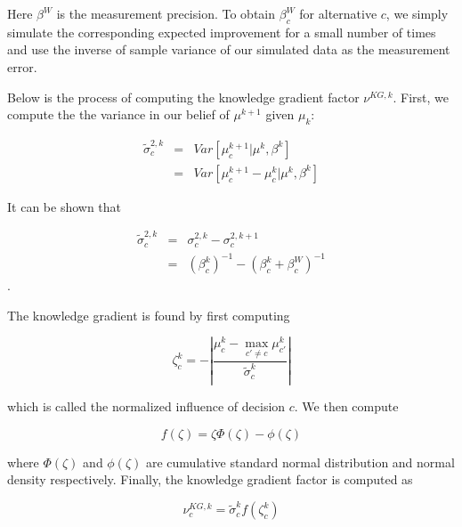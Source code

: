 \documentclass[12pt]{article}
\begin{document}
Here $\beta^W$ is the measurement precision. To obtain $\beta^W_c$ for alternative $c$, we simply simulate the corresponding expected improvement for a small number of times and use the inverse of sample variance of our simulated data as the measurement error. 

Below is the process of computing the knowledge gradient factor $\nu^{KG,k}$. First, we compute the the variance in our belief of $\mu^{k+1}$ given $\mu_k$:

\begin{eqnarray*}
\tilde{\sigma}_c^{2,k} & = & Var[\mu^{k+1}_c|\mu^k,\beta^k] \\
                       & = & Var[\mu^{k+1}_c - \mu_c^k|\mu^k,\beta^k]
\end{eqnarray*}

It can be shown that

\begin{eqnarray*}
\tilde{\sigma}_c^{2,k} & = & \sigma^{2,k}_c-\sigma^{2,k+1}_c \\
                       & = & (\beta_c^k)^{-1}-(\beta_c^k+\beta_c^W)^{-1}
\end{eqnarray*}.

The knowledge gradient is found by first computing

\begin{equation*}
\zeta^k_c = -\left|\frac{\mu_c^k-\max_{c'\ne c} \mu_{c'}^k}{\tilde{\sigma}_c^k}\right|
\end{equation*}

which is called the normalized influence of decision $c$. We then compute 

\begin{equation*}
f(\zeta) = \zeta\Phi(\zeta)-\phi(\zeta)
\end{equation*}

where $\Phi(\zeta)$ and $\phi(\zeta)$ are cumulative standard normal distribution and normal density respectively. Finally, the knowledge gradient factor is computed as

\begin{equation*}
\nu^{KG,k}_c = \tilde{\sigma}_c^{k}f(\zeta_c^k)
\end{equation*}




\end{document}
